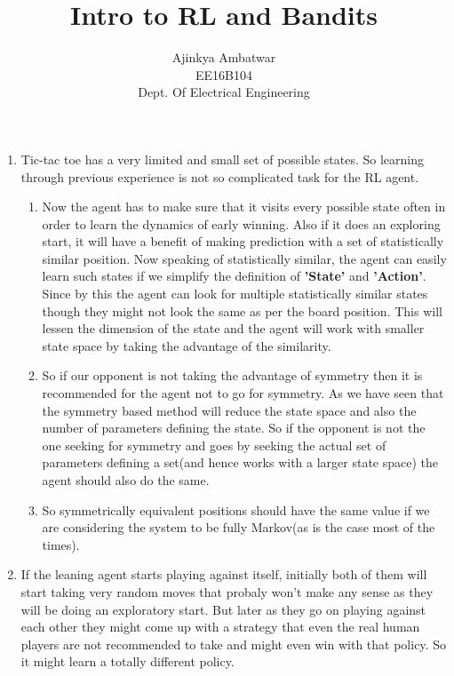 \documentclass[a4paper,english]{article}
\begin{document}
\title{Intro to RL and Bandits}

\author{Ajinkya Ambatwar\\
EE16B104\\
Dept. Of Electrical Engineering}
\maketitle
\begin{enumerate}
\item Tic-tac toe has a very limited and small set of possible states. So
learning through previous experience is not so complicated task for
the RL agent. 
\begin{enumerate}
\item Now the agent has to make sure that it visits every possible state
often in order to learn the dynamics of early winning. Also if it
does an exploring start, it will have a benefit of making prediction
with a set of statistically similar position. Now speaking of statistically
similar, the agent can easily learn such states if we simplify the
definition of \textbf{'State'} and \textbf{'Action'}. Since by this
the agent can look for multiple statistically similar states though
they might not look the same as per the board position. This will
lessen the dimension of the state and the agent will work with smaller
state space by taking the advantage of the similarity.
\item So if our opponent is not taking the advantage of symmetry then it
is recommended for the agent not to go for symmetry. As we have seen
that the symmetry based method will reduce the state space and also
the number of parameters defining the state. So if the opponent is
not the one seeking for symmetry and goes by seeking the actual set
of parameters defining a set(and hence works with a larger state space)
the agent should also do the same. 
\item So symmetrically equivalent positions should have the same value if
we are considering the system to be fully Markov(as is the case most
of the times).
\end{enumerate}
\item If the leaning agent starts playing against itself, initially both
of them will start taking very random moves that probaly won't make
any sense as they will be doing an exploratory start. But later as
they go on playing against each other they might come up with a strategy
that even the real human players are not recommended to take and might
even win with that policy. So it might learn a totally different policy.

\end{enumerate}
\end{document}
